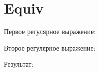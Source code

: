 \section{Equiv}
\begin{frame}{}
	Первое регулярное выражение:


	Второе регулярное выражение:


	Результат:

\end{frame}
